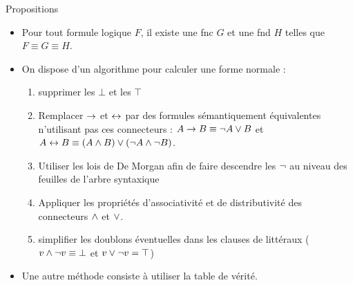 \documentclass[10pt]{beamer}
\begin{document}
\begin{frame}{\Ctitle}{\stitle}
    \begin{alertblock}{Propositions}
        \begin{itemize}
            \item<1-> Pour tout formule logique $F$, il existe une {\sc fnc} $G$ et une {\sc fnd} $H$ telles que $F \equiv G \equiv H$.
            \item<2-> On dispose d'un algorithme pour calculer une forme normale :
            \begin{enumerate}
                \item<3-> supprimer les $\bot$ et les $\top$
                \item<4-> Remplacer $\to$ et $\leftrightarrow$ par des formules sémantiquement équivalentes  n'utilisant pas ces connecteurs : $A \to B \equiv \neg A \vee B$ et $ A \leftrightarrow B \equiv (A \wedge B) \vee (\neg A \wedge \neg B)$.
                \item<5-> Utiliser les lois de De Morgan afin de faire descendre les $\neg$ au niveau des feuilles de l'arbre syntaxique
                \item<6-> Appliquer les propriétés d'associativité et de distributivité des connecteurs $\wedge$ et $\vee$.
                \item<7-> simplifier les doublons éventuelles dans les clauses de littéraux ($v \wedge \neg v \equiv \bot$ et $v \vee \neg v = \top$)
            \end{enumerate}
            \item<8-> Une autre méthode consiste à utiliser la table de vérité.
        \end{itemize}
    \end{alertblock}
\end{frame}
\end{document}
